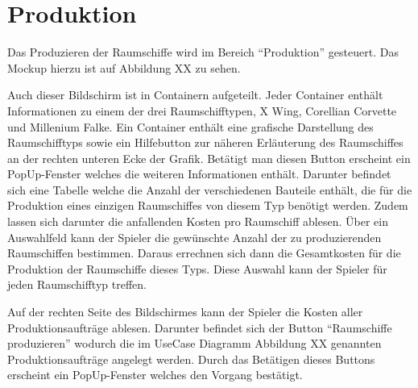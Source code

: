 \section{Produktion}
\label{sec:ui-produktion}

Das Produzieren der Raumschiffe wird im Bereich “Produktion” gesteuert. Das Mockup hierzu ist auf Abbildung XX zu sehen. 

Auch dieser Bildschirm ist in Containern aufgeteilt. Jeder Container enthält Informationen zu einem der drei Raumschifftypen, X Wing, Corellian Corvette und Millenium Falke. Ein Container enthält eine grafische Darstellung des Raumschifftyps sowie ein Hilfebutton zur näheren Erläuterung des Raumschiffes an der rechten unteren Ecke der Grafik. Betätigt man diesen Button erscheint ein PopUp-Fenster welches die weiteren Informationen enthält. Darunter befindet sich eine Tabelle welche die Anzahl der verschiedenen Bauteile enthält, die für die Produktion eines einzigen Raumschiffes von diesem Typ benötigt werden. Zudem lassen sich darunter die anfallenden Kosten pro Raumschiff ablesen. Über ein Auswahlfeld kann der Spieler die gewünschte Anzahl der zu produzierenden Raumschiffen bestimmen. Daraus errechnen sich dann die Gesamtkosten für die Produktion der Raumschiffe dieses Typs. Diese Auswahl kann der Spieler für jeden Raumschifftyp treffen.

Auf der rechten Seite des Bildschirmes kann der Spieler die Kosten aller Produktionsaufträge ablesen. Darunter befindet sich der Button “Raumschiffe produzieren” wodurch die im UseCase Diagramm Abbildung XX genannten Produktionsaufträge angelegt werden. Durch das Betätigen dieses Buttons erscheint ein PopUp-Fenster welches den Vorgang bestätigt. 